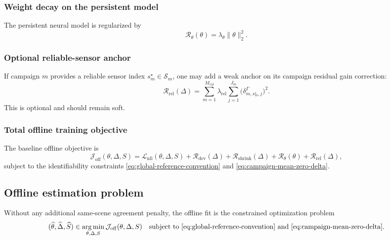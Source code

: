 \subsubsection{Weight decay on the persistent model}

The persistent neural model is regularized by
\begin{equation}
\mathcal R_\theta(\theta)
=
\lambda_\theta \|\theta\|_2^2.
\label{eq:Rtheta}
\end{equation}

\subsubsection{Optional reliable-sensor anchor}

If campaign $m$ provides a reliable sensor index $s_m^\star\in\mathcal S_m$,
one may add a weak anchor on its campaign residual gain correction:
\begin{equation}
\mathcal R_{\mathrm{rel}}(\Delta)
=
\sum_{m=1}^{M_{\mathrm{cal}}}
\lambda_{\mathrm{rel}}
\sum_{j=1}^{J_m}
\bigl(
\delta^\Gamma_{m,s_m^\star,j}
\bigr)^2.
\label{eq:Rrel}
\end{equation}
This is optional and should remain soft.

\subsubsection{Total offline training objective}

The baseline offline objective is
\begin{equation}
\mathcal J_{\mathrm{off}}(\theta,\Delta,S)
=
\mathcal L_{\mathrm{nll}}(\theta,\Delta,S)
+
\mathcal R_{\mathrm{dev}}(\Delta)
+
\mathcal R_{\mathrm{shrink}}(\Delta)
+
\mathcal R_\theta(\theta)
+
\mathcal R_{\mathrm{rel}}(\Delta),
\label{eq:Joff}
\end{equation}
subject to the identifiability constraints
\eqref{eq:global-reference-convention} and
\eqref{eq:campaign-mean-zero-delta}.

\subsection{Offline estimation problem}

Without any additional same-scene agreement penalty, the offline fit is the
constrained optimization problem
\begin{equation}
(\widehat\theta,\widehat\Delta,\widehat S)
\in
\operatorname*{arg\,min}_{\theta,\Delta,S}
\mathcal J_{\mathrm{off}}(\theta,\Delta,S)
\quad
\text{subject to }
\eqref{eq:global-reference-convention}
\text{ and }
\eqref{eq:campaign-mean-zero-delta}.
\label{eq:offline-estimation-problem}
\end{equation}

